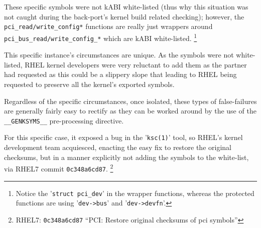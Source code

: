 \documentclass[10pt,oneside,english]{book}
\begin{document}

These specific symbols were not kABI white-listed (thus why this situation
was not caught during the back-port's kernel build related checking);
however, the \texttt{pci\_read/write\_config{*}} functions are really
just wrappers around \texttt{pci\_bus\_read/write\_config\_{*}} which
are kABI white-listed. \footnote{Notice the '\texttt{struct pci\_dev}' in the wrapper functions, whereas
the protected functions are using '\texttt{dev->bus}' and '\texttt{dev->devfn}'.}

This specific instance's circumstances are unique. As the symbols
were not white-listed, RHEL kernel developers were very reluctant
to add them as the partner had requested as this could be a slippery
slope that leading to RHEL being requested to preserve all the kernel's
exported symbols.

Regardless of the specific circumstances, once isolated, these types
of false-failures are generally fairly easy to rectify as they can
be worked around by the use of the \texttt{\_\_GENKSYMS\_\_} pre-processing
directive.

For this specific case, it exposed a bug in the '\texttt{ksc(1)}'
tool, so RHEL's kernel development team acquiesced, enacting the easy
fix to restore the original checksums, but in a manner explicitly
not adding the symbols to the white-list, via RHEL7 commit \texttt{0c348a6cd87}.
\footnote{RHEL7: \texttt{0c348a6cd87} ``PCI: Restore original checksums of
pci symbols''}

\end{document}
